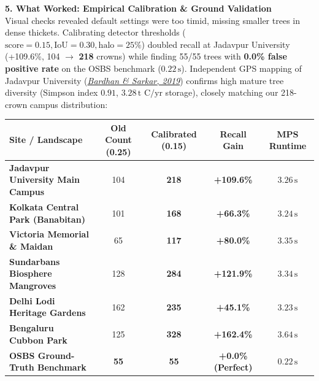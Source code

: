 \documentclass[10pt,a4paper]{article}
\begin{document}
\vspace{0.2em}
\noindent\textbf{\large 5. What Worked: Empirical Calibration \& Ground Validation}\\[0.25em]
Visual checks revealed default settings were too timid, missing smaller trees in dense thickets. Calibrating detector thresholds ($\text{score}=0.15, \text{IoU}=0.30, \text{halo}=25\%$) doubled recall at Jadavpur University (+109.6\%, 104 $\to$ \textbf{218} crowns) while finding 55/55 trees with \textbf{0.0\% false positive rate} on the OSBS benchmark ($0.22\,\text{s}$). Independent GPS mapping of Jadavpur University (\href{https://doi.org/10.36808/if/2019/v145i3/144454}{\textit{Bardhan \& Sarkar, 2019}}) confirms high mature tree diversity (Simpson index $0.91$, $3.28\,\text{t C/yr}$ storage), closely matching our 218-crown campus distribution:

\vspace{-0.3em}
\begin{center}
\footnotesize
\begin{tabular}{@{}lcccc@{}}
\toprule
\textbf{Site / Landscape} & \textbf{Old Count (0.25)} & \textbf{Calibrated (0.15)} & \textbf{Recall Gain} & \textbf{MPS Runtime} \\ \midrule
\textbf{Jadavpur University Main Campus} & 104 & \textbf{218} & \textbf{+109.6\%} & $3.26\,\text{s}$ \\
\textbf{Kolkata Central Park (Banabitan)} & 101 & \textbf{168} & \textbf{+66.3\%} & $3.24\,\text{s}$ \\
\textbf{Victoria Memorial \& Maidan} & 65 & \textbf{117} & \textbf{+80.0\%} & $3.35\,\text{s}$ \\
\textbf{Sundarbans Biosphere Mangroves} & 128 & \textbf{284} & \textbf{+121.9\%} & $3.34\,\text{s}$ \\
\textbf{Delhi Lodi Heritage Gardens} & 162 & \textbf{235} & \textbf{+45.1\%} & $3.23\,\text{s}$ \\
\textbf{Bengaluru Cubbon Park} & 125 & \textbf{328} & \textbf{+162.4\%} & $3.64\,\text{s}$ \\
\textbf{OSBS Ground-Truth Benchmark} & \textbf{55} & \textbf{55} & \textbf{+0.0\% (Perfect)} & $0.22\,\text{s}$ \\ \bottomrule
\end{tabular}
\end{center}
\end{document}
